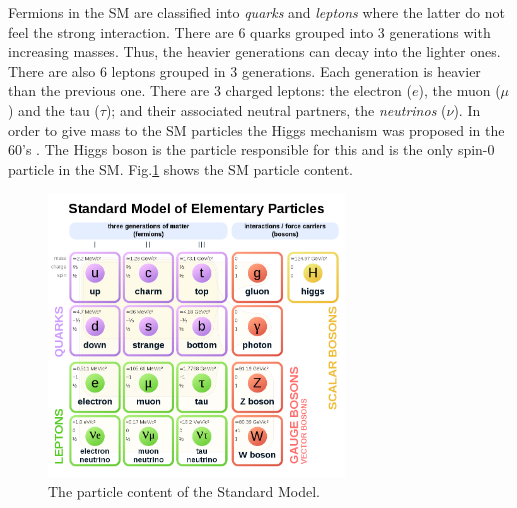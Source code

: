 Fermions in the SM are classified into \textit{quarks} and \textit{leptons} where the latter do not feel the strong interaction. There are 6 quarks grouped into 3 generations with increasing masses. Thus, the heavier generations can decay into the lighter ones. There are also 6 leptons grouped in 3 generations. Each generation is heavier than the previous one. There are 3 charged leptons: the electron ($e$), the muon ($\mu$) and the tau ($\tau$); and their associated neutral partners, the \textit{neutrinos} ($\nu$). In order to give mass to the SM particles the Higgs mechanism was proposed in the 60's \cite{PhysRevLett.13.508,PhysRevLett.13.321,PhysRevLett.13.585}. The Higgs boson is the particle responsible for this and is the only spin-0 particle in the SM. Fig.\ref{Fig14} shows the SM particle content.
\begin{figure}[h]
	\centering
	\includegraphics[width=0.7\textwidth]{figures/Fig14}
	\caption{The particle content of the Standard Model.}
	\label{Fig14}
\end{figure}
